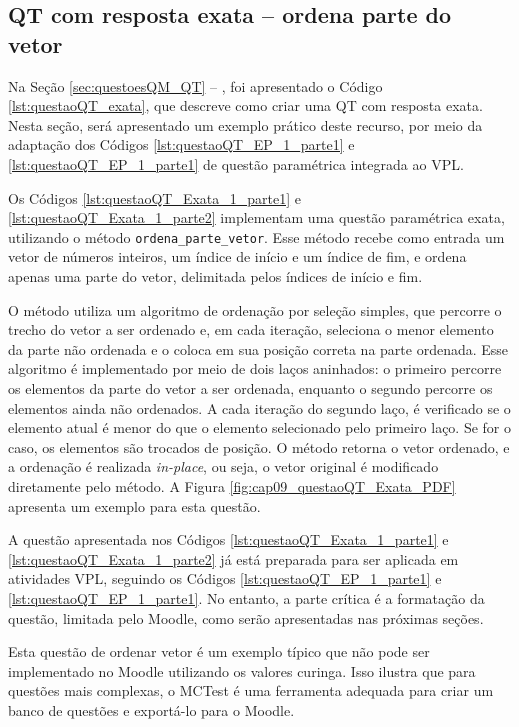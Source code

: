 \subsection{QT com resposta exata -- ordena parte do vetor}

Na Seção \ref{sec:questoesQM_QT} -- , foi apresentado o Código \ref{lst:questaoQT_exata}, que descreve como criar uma QT com resposta exata. Nesta seção, será apresentado um exemplo prático deste recurso, por meio da adaptação dos Códigos \ref{lst:questaoQT_EP_1_parte1} e \ref{lst:questaoQT_EP_1_parte1} de questão paramétrica integrada ao VPL.

Os Códigos \ref{lst:questaoQT_Exata_1_parte1} e \ref{lst:questaoQT_Exata_1_parte2} implementam uma questão paramétrica exata, utilizando o método \verb|ordena_parte_vetor|. Esse método recebe como entrada um vetor de números inteiros, um índice de início e um índice de fim, e ordena apenas uma parte do vetor, delimitada pelos índices de início e fim.

O método utiliza um algoritmo de ordenação por seleção simples, que percorre o trecho do vetor a ser ordenado e, em cada iteração, seleciona o menor elemento da parte não ordenada e o coloca em sua posição correta na parte ordenada. Esse algoritmo é implementado por meio de dois laços aninhados: o primeiro percorre os elementos da parte do vetor a ser ordenada, enquanto o segundo percorre os elementos ainda não ordenados. A cada iteração do segundo laço, é verificado se o elemento atual é menor do que o elemento selecionado pelo primeiro laço. Se for o caso, os elementos são trocados de posição.
%
O método retorna o vetor ordenado, e a ordenação é realizada \textit{in-place}, ou seja, o vetor original é modificado diretamente pelo método. A Figura \ref{fig:cap09_questaoQT_Exata_PDF} apresenta um exemplo para esta questão.

A questão apresentada nos Códigos \ref{lst:questaoQT_Exata_1_parte1} e \ref{lst:questaoQT_Exata_1_parte2} já está preparada para ser aplicada em atividades VPL, seguindo os Códigos \ref{lst:questaoQT_EP_1_parte1} e \ref{lst:questaoQT_EP_1_parte1}. No entanto, a parte crítica é a formatação da questão, limitada pelo Moodle, como serão apresentadas nas próximas seções.

Esta questão de ordenar vetor é um exemplo típico que não pode ser implementado no Moodle utilizando os valores curinga. Isso ilustra que para questões mais complexas, o MCTest é uma ferramenta adequada para criar um banco de questões e exportá-lo para o Moodle.


